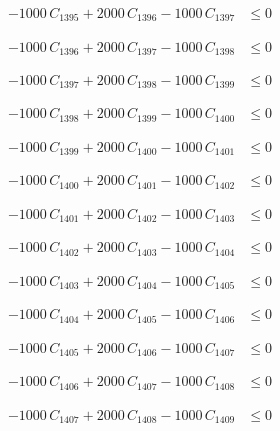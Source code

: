 \documentclass[a4paper,11pt]{article}
\begin{document}
\begin{align}
-1000\,C_{1395} + 2000\,C_{1396} - 1000\,C_{1397} &\leq 0 \nonumber
\end{align}

\begin{align}
-1000\,C_{1396} + 2000\,C_{1397} - 1000\,C_{1398} &\leq 0 \nonumber
\end{align}

\begin{align}
-1000\,C_{1397} + 2000\,C_{1398} - 1000\,C_{1399} &\leq 0 \nonumber
\end{align}

\begin{align}
-1000\,C_{1398} + 2000\,C_{1399} - 1000\,C_{1400} &\leq 0 \nonumber
\end{align}

\begin{align}
-1000\,C_{1399} + 2000\,C_{1400} - 1000\,C_{1401} &\leq 0 \nonumber
\end{align}

\begin{align}
-1000\,C_{1400} + 2000\,C_{1401} - 1000\,C_{1402} &\leq 0 \nonumber
\end{align}

\begin{align}
-1000\,C_{1401} + 2000\,C_{1402} - 1000\,C_{1403} &\leq 0 \nonumber
\end{align}

\begin{align}
-1000\,C_{1402} + 2000\,C_{1403} - 1000\,C_{1404} &\leq 0 \nonumber
\end{align}

\begin{align}
-1000\,C_{1403} + 2000\,C_{1404} - 1000\,C_{1405} &\leq 0 \nonumber
\end{align}

\begin{align}
-1000\,C_{1404} + 2000\,C_{1405} - 1000\,C_{1406} &\leq 0 \nonumber
\end{align}

\begin{align}
-1000\,C_{1405} + 2000\,C_{1406} - 1000\,C_{1407} &\leq 0 \nonumber
\end{align}

\begin{align}
-1000\,C_{1406} + 2000\,C_{1407} - 1000\,C_{1408} &\leq 0 \nonumber
\end{align}

\begin{align}
-1000\,C_{1407} + 2000\,C_{1408} - 1000\,C_{1409} &\leq 0 \nonumber
\end{align}
\end{document}
